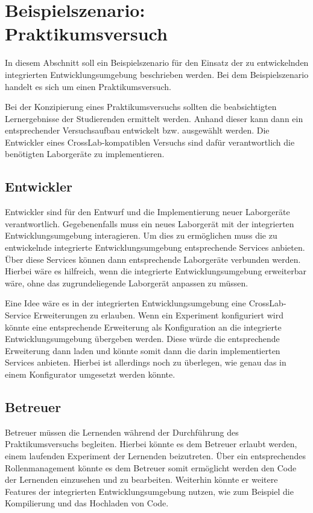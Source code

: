 \section{Beispielszenario: Praktikumsversuch} \label{beispielszenario}

In diesem Abschnitt soll ein Beispielszenario für den Einsatz der zu entwickelnden integrierten Entwicklungsumgebung beschrieben werden. Bei dem Beispielszenario handelt es sich um einen Praktikumsversuch.

Bei der Konzipierung eines Praktikumsversuchs sollten die beabsichtigten Lernergebnisse der Studierenden ermittelt werden. Anhand dieser kann dann ein entsprechender Versuchsaufbau entwickelt bzw. ausgewählt werden. Die Entwickler eines CrossLab-kompatiblen Versuchs sind dafür verantwortlich die benötigten Laborgeräte zu implementieren.

\subsection{Entwickler}

Entwickler sind für den Entwurf und die Implementierung neuer Laborgeräte verantwortlich. Gegebenenfalls muss ein neues Laborgerät mit der integrierten Entwicklungsumgebung interagieren. Um dies zu ermöglichen muss die zu entwickelnde integrierte Entwicklungsumgebung entsprechende Services anbieten. Über diese Services können dann entsprechende Laborgeräte verbunden werden. Hierbei wäre es hilfreich, wenn die integrierte Entwicklungsumgebung erweiterbar wäre, ohne das zugrundeliegende Laborgerät anpassen zu müssen.

\begin{note}
    Eine Idee wäre es in der integrierten Entwicklungsumgebung eine CrossLab-Service Erweiterungen zu erlauben. Wenn ein Experiment konfiguriert wird könnte eine entsprechende Erweiterung als Konfiguration an die integrierte Entwicklungsumgebung übergeben werden. Diese würde die entsprechende Erweiterung dann laden und könnte somit dann die darin implementierten Services anbieten. Hierbei ist allerdings noch zu überlegen, wie genau das in einem Konfigurator umgesetzt werden könnte.
\end{note}

\subsection{Betreuer}

Betreuer müssen die Lernenden während der Durchführung des Praktikumsversuchs begleiten. Hierbei könnte es dem Betreuer erlaubt werden, einem laufenden Experiment der Lernenden beizutreten. Über ein entsprechendes Rollenmanagement könnte es dem Betreuer somit ermöglicht werden den Code der Lernenden einzusehen und zu bearbeiten. Weiterhin könnte er weitere Features der integrierten Entwicklungsumgebung nutzen, wie zum Beispiel die Kompilierung und das Hochladen von Code.

